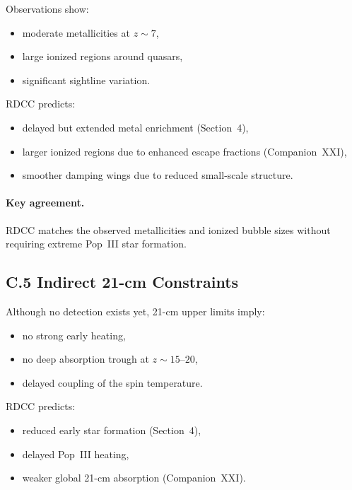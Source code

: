 \documentclass[11pt,a4paper]{article}
\begin{document}
Observations show:

\begin{itemize}
    \item moderate metallicities at $z \sim 7$,
    \item large ionized regions around quasars,
    \item significant sightline variation.
\end{itemize}

RDCC predicts:

\begin{itemize}
    \item delayed but extended metal enrichment (Section~4),
    \item larger ionized regions due to enhanced escape fractions (Companion~XXI),
    \item smoother damping wings due to reduced small-scale structure.
\end{itemize}

\paragraph{Key agreement.}
RDCC matches the observed metallicities and ionized bubble sizes without requiring extreme 
Pop~III star formation.

\subsection*{C.5 Indirect 21-cm Constraints}

Although no detection exists yet, 21-cm upper limits imply:

\begin{itemize}
    \item no strong early heating,
    \item no deep absorption trough at $z \sim 15$--$20$,
    \item delayed coupling of the spin temperature.
\end{itemize}

RDCC predicts:

\begin{itemize}
    \item reduced early star formation (Section~4),
    \item delayed Pop~III heating,
    \item weaker global 21-cm absorption (Companion~XXI).
\end{itemize}
\end{document}
